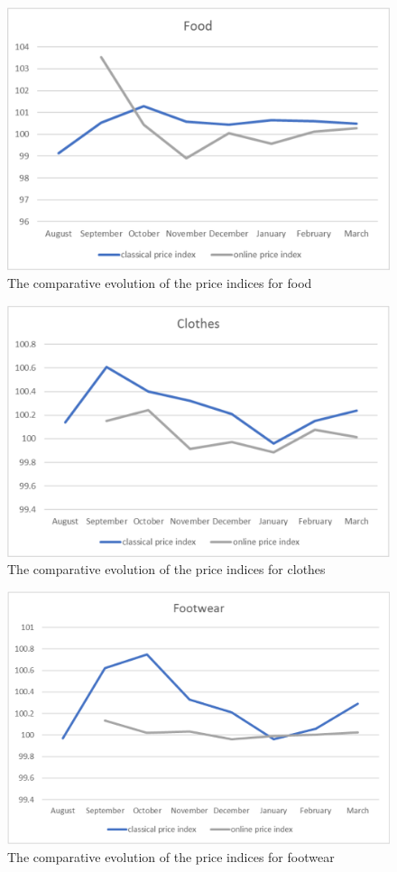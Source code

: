 \documentclass[]{article}
\begin{document}
\begin{figure}
\centering
\includegraphics[width=0.7\linewidth]{fig3.eps}
\caption{The comparative evolution of the price indices for food}
\label{fig:3}
\end{figure}


\begin{figure}
\centering
\includegraphics[width=0.7\linewidth]{fig4.eps}
\caption{The comparative evolution of the price indices for clothes}
\label{fig:4}
\end{figure}


\begin{figure}
\centering
\includegraphics[width=0.7\linewidth]{fig5.eps}
\caption{The comparative evolution of the price indices for footwear}
\label{fig:5}
\end{figure}
\end{document}
